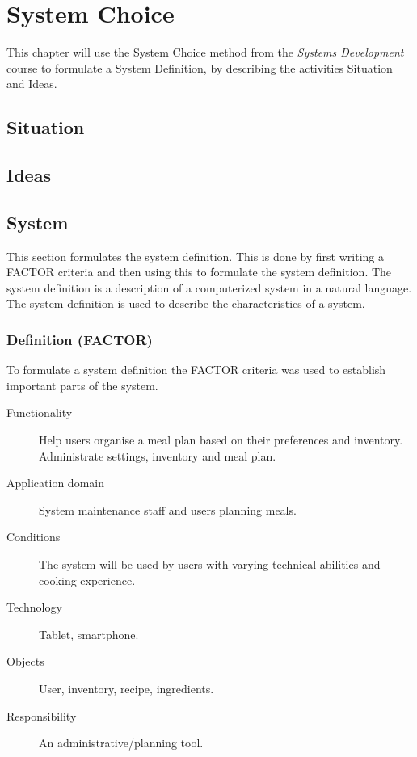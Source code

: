 \chapter{System Choice}
This chapter will use the System Choice method from the \textit{Systems Development} course to formulate a System Definition, by describing the activities Situation and Ideas.

\section{Situation} \label{SituationLabel}


\section{Ideas} \label{IdeasLabel}


\section{System}
This section formulates the system definition. This is done by first writing a FACTOR criteria and then using this to formulate the system definition. The system definition is a description of a computerized system in a natural language. The system definition is used to describe the characteristics of a system.
\subsection{Definition (FACTOR)}
To formulate a system definition the FACTOR\cite{OOAD_BATOF} criteria was used to establish important parts of the system.

\begin{description}
	\item[Functionality] Help users organise a meal plan based on their preferences and inventory. Administrate settings, inventory and meal plan.
	\item[Application domain] System maintenance staff and users planning meals.
	\item[Conditions] The system will be used by users with varying technical abilities and cooking experience.
	\item[Technology] Tablet, smartphone.
	\item[Objects] User, inventory, recipe, ingredients.
	\item[Responsibility] An administrative/planning tool.
\end{description}

